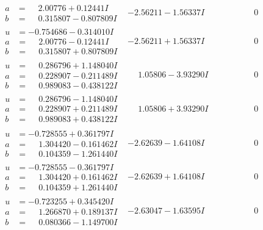 \documentclass[1p]{elsarticle_modified}
\theoremstyle{definition}
\begin{document}
$$\begin{array}{c|c|c}
\begin{aligned}
a &= \phantom{-}2.00776 + 0.12441 I \\
b &= \phantom{-}0.315807 - 0.807809 I\end{aligned}
 & -2.56211 - 1.56337 I & \phantom{-0.000000 } 0 \\ \hline\begin{aligned}
u &= -0.754686 - 0.314010 I \\
a &= \phantom{-}2.00776 - 0.12441 I \\
b &= \phantom{-}0.315807 + 0.807809 I\end{aligned}
 & -2.56211 + 1.56337 I & \phantom{-0.000000 } 0 \\ \hline\begin{aligned}
u &= \phantom{-}0.286796 + 1.148040 I \\
a &= \phantom{-}0.228907 - 0.211489 I \\
b &= \phantom{-}0.989083 - 0.438122 I\end{aligned}
 & \phantom{-}1.05806 - 3.93290 I & \phantom{-0.000000 } 0 \\ \hline\begin{aligned}
u &= \phantom{-}0.286796 - 1.148040 I \\
a &= \phantom{-}0.228907 + 0.211489 I \\
b &= \phantom{-}0.989083 + 0.438122 I\end{aligned}
 & \phantom{-}1.05806 + 3.93290 I & \phantom{-0.000000 } 0 \\ \hline\begin{aligned}
u &= -0.728555 + 0.361797 I \\
a &= \phantom{-}1.304420 - 0.161462 I \\
b &= \phantom{-}0.104359 - 1.261440 I\end{aligned}
 & -2.62639 - 1.64108 I & \phantom{-0.000000 } 0 \\ \hline\begin{aligned}
u &= -0.728555 - 0.361797 I \\
a &= \phantom{-}1.304420 + 0.161462 I \\
b &= \phantom{-}0.104359 + 1.261440 I\end{aligned}
 & -2.62639 + 1.64108 I & \phantom{-0.000000 } 0 \\ \hline\begin{aligned}
u &= -0.723255 + 0.345420 I \\
a &= \phantom{-}1.266870 + 0.189137 I \\
b &= \phantom{-}0.080366 - 1.149700 I\end{aligned}
 & -2.63047 - 1.63595 I & \phantom{-0.000000 } 0\\

\end{array}$$
\end{document}
